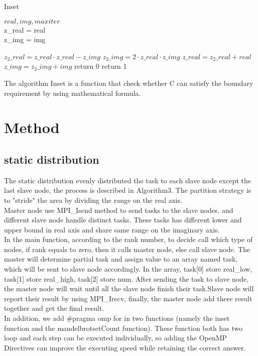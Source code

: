 \documentclass[a4paper]{article}
\begin{document}
\begin{algorithm}
\caption{Inset}
\begin{algorithmic}
\REQUIRE $real, img, maxiter$
\\z\_real = real
\\z\_img = img

\STATE $z_2\_real = z\_real \cdot z\_real - z\_img $
\STATE $z_2\_img = 2\cdot z\_real \cdot z\_img $
\STATE $z\_real = z_2\_real + real$
\STATE $z\_img = z_2\_img + img$
\STATE return 0 
\ENDIF
\ENDFOR
\STATE return 1

\end{algorithmic}
\end{algorithm}

The algorithm Inset is a function that check whether C can satisfy the boundary requirement by using mathematical formula.

\section{Method}
\label{sec:theory}

\subsection{static distribution}
The static distribution evenly distributed the task to each slave node except the last slave node, the process is described in Algorithm3. The partition strategy is to "stride" the area by dividing the range on the real axis.\\Master node use MPI\_Isend method to send tasks to the slave nodes, and different slave node handle distinct tasks. These tasks has different lower and upper bound in real axis and share same range on the imaginary axis.\\
In the main function, according to the rank number, to decide call which type of nodes, if rank equals to zero, then it calls master node, else call slave node. The master will determine partial task and assign value to an array named task, which will be sent to slave node accordingly. 
In the array, task[0] store real\_low,  task[1] store real\_high, task[2] store num. After sending the task to slave node, the master node will wait until all the slave node finish their task.Slave node will report their result by using MPI\_Irecv, finally, the master node add there result together and get the final result.\\
In addition, we add \#pragma omp for in two functions (namely the inset function and the mandelbrotsetCount function). These function both has two loop and each step can be executed individually, so adding the OpenMP Directives can improve the executing speed while retaining the correct answer.
\end{document}
